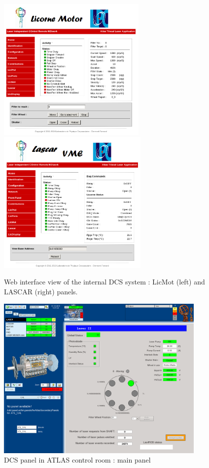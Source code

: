\begin{figure}[htbp]
\centering
\includegraphics[height=7cm]{figures/licorne_web3.png}
\includegraphics[height=7cm]{figures/licorne_web4.png}
\caption{Web interface view of the internal DCS system : LicMot (left) and LASCAR (right) panels.}\label{fig:licorne_webb}
\end{figure}


\begin{figure}[htbp]
\centering
\includegraphics[height=8cm]{figures/dcs_cr_filterwheel.png}
\caption{DCS panel in ATLAS control room : main panel}\label{fig:dcs_cr_a}
\end{figure}

